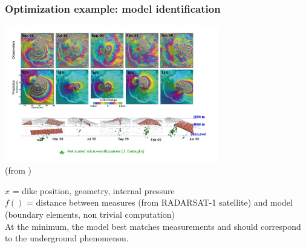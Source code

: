 \documentclass[12pt]{beamer}
\begin{document}

\begin{frame}
\frametitle{Optimization example: model identification}
\begin{center}
\includegraphics[width=0.7\textwidth]{piton_fournaise.jpg}\\
\vspace{-1cm}
{\hfill\tiny (from \cite{fukushima2010evolution})}
\end{center}
$x$ = dike position, geometry, internal pressure\\
$f()$ = distance between measures (from RADARSAT-1 satellite) and model (boundary elements, non trivial computation)\\
At the minimum, the model best matches measurements and should correspond to the underground phenomenon.
\end{frame}
\end{document}
